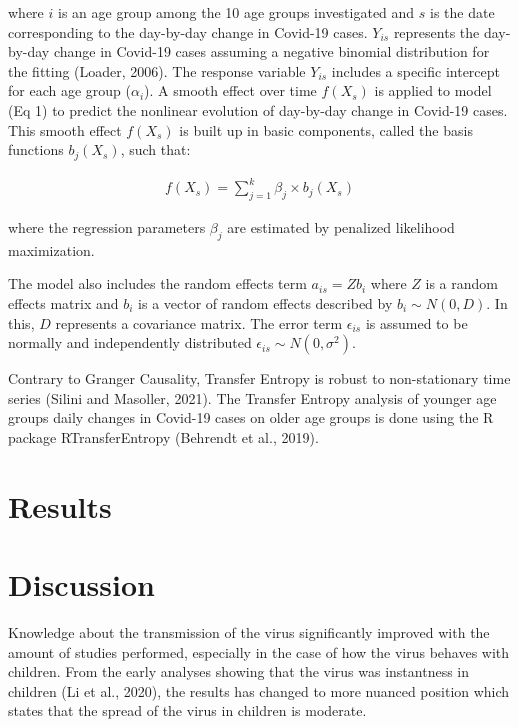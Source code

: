 \documentclass[]{elsarticle} %
\begin{document}
\noindent where \(i\) is an age group among the 10 age groups
investigated and \(s\) is the date corresponding to the day-by-day
change in Covid-19 cases. \(Y_{is}\) represents the day-by-day change in
Covid-19 cases assuming a negative binomial distribution for the fitting
(Loader, 2006). The response variable \(Y_{is}\) includes a specific
intercept for each age group (\(\alpha_{i}\)). A smooth effect over time
\(f(X_{s})\) is applied to model (Eq 1) to predict the nonlinear
evolution of day-by-day change in Covid-19 cases. This smooth effect
\(f(X_{s})\) is built up in basic components, called the basis functions
\(b_{j}(X_{s})\), such that:

\begin{align}
f(X_{s})=\sum_{j=1}^{k}\beta_{j}\times b_{j}(X_{s})
\end{align}

\noindent where the regression parameters \(\beta_{j}\) are estimated by
penalized likelihood maximization.

The model also includes the random effects term \(a_{is}= Zb_{i}\) where
\(Z\) is a random effects matrix and \(b_{i}\) is a vector of random
effects described by \(b_{i} \sim N(0, D)\). In this, \(D\) represents a
covariance matrix. The error term \(\epsilon_{is}\) is assumed to be
normally and independently distributed
\(\epsilon_{is} \sim N(0, \sigma^2)\).

Contrary to Granger Causality, Transfer Entropy is robust to
non-stationary time series (Silini and Masoller, 2021). The Transfer
Entropy analysis of younger age groups daily changes in Covid-19 cases
on older age groups is done using the R package RTransferEntropy
(Behrendt et al., 2019).

\hypertarget{results}{%
\section{Results}\label{results}}

\hypertarget{discussion}{%
\section{Discussion}\label{discussion}}

Knowledge about the transmission of the virus significantly improved
with the amount of studies performed, especially in the case of how the
virus behaves with children. From the early analyses showing that the
virus was instantness in children (Li et al., 2020), the results has
changed to more nuanced position which states that the spread of the
virus in children is moderate.
\end{document}
